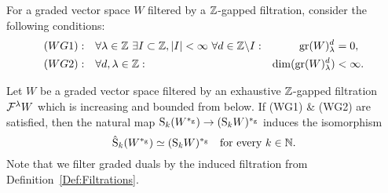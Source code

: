\documentclass[\MainFolder/Text.tex]{subfiles}
\begin{document}
For a graded vector space $W$ filtered by a $\mathbb{Z}$-gapped filtration, consider the following conditions:
\begin{equation}\label{Eq:WGs}
\begin{aligned}
(WG1):\quad& \forall \lambda\in \mathbb{Z}\ \exists I \subset \mathbb{Z}, |I|<\infty\ \forall d\in \mathbb{Z}\backslash I:& \operatorname{\mathrm{gr}}(W)_\lambda^d &= 0, \\
(WG2):\quad & \forall d, \lambda\in \mathbb{Z}:& \dim(\operatorname{\mathrm{gr}}(W)_\lambda^d) &< \infty.
\end{aligned}
\end{equation}

\begin{Lemma}\label{Lem:Terrible}
Let $W$ be a graded vector space filtered by an exhaustive $\mathbb{Z}$-gapped filtration~$\mathcal{F}^\lambda W$ which is increasing and bounded from below. If (WG1) \& (WG2) are satisfied, then the natural map $\mathrm{S}_k(W^{*_{\mathrm{g}}}) \rightarrow (\mathrm{S}_k W)^{*_{\mathrm{g}}}$ induces the isomorphism 
\[ \hat{\mathrm{S}}_k(W^{*_{\mathrm{g}}}) \simeq  (\mathrm{S}_k W)^{*_{\mathrm{g}}} \quad\text{for every }k\in \mathbb{N}.\]
Note that we filter graded duals by the induced filtration from Definition~\ref{Def:Filtrations}.
\end{Lemma}
\end{document}
